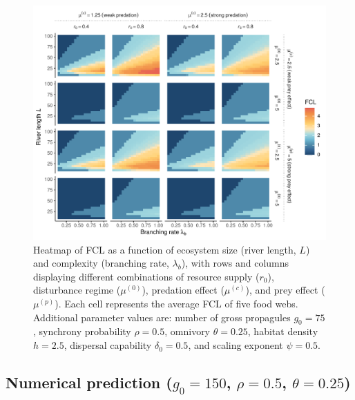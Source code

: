 \begin{figure}
\centering
\includegraphics{../data_fmt/fig_rho05_g75_theta025.pdf}
\caption{Heatmap of FCL as a function of ecosystem size (river length,
\(L\)) and complexity (branching rate, \(\lambda_b\)), with rows and
columns displaying different combinations of resource supply (\(r_0\)),
disturbance regime (\(\mu^{(0)}\)), predation effect (\(\mu^{(c)}\)),
and prey effect (\(\mu^{(p)}\)). Each cell represents the average FCL of
five food webs. Additional parameter values are: number of gross
propagules \(g_0=75\), synchrony probability \(\rho=0.5\), omnivory
\(\theta=0.25\), habitat density \(h=2.5\), dispersal capability
\(\delta_0=0.5\), and scaling exponent \(\psi=0.5\).}
\end{figure}

\newpage

\subsection{\texorpdfstring{Numerical prediction (\(g_0=150\),
\(\rho=0.5\),
\(\theta=0.25\))}{Numerical prediction (g\_0=150, \textbackslash rho=0.5, \textbackslash theta=0.25)}}\label{numerical-prediction-g_0150-rho0.5-theta0.25}

